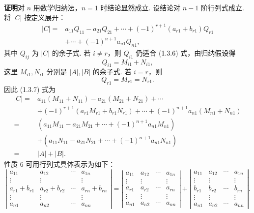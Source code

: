 \documentclass[UTF8, 12pt, fontset=fandol, oneside]{ctexart}
\begin{document}
\noindent\textbf{证明}\quad 对 $n$ 用数学归纳法，$n=1$ 时结论显然成立. 设结论对 $n-1$ 阶行列式成立. 将 $|C|$ 按定义展开：
\begin{equation}
\begin{aligned}
|C|={}&a_{11}Q_{11}-a_{21}Q_{21}+\cdots+(-1)^{r+1}(a_{r1}+b_{r1})Q_{r1}\\
&+\cdots+(-1)^{n+1}a_{n1}Q_{n1},
\end{aligned}
\tag{1.3.7}
\end{equation}
其中 $Q_{ij}$ 为 $|C|$ 的余子式. 若 $i\ne r$，则 $Q_{i1}$ 仍适合 (1.3.6) 式，由归纳假设得
\[
Q_{i1}=M_{i1}+N_{i1},
\]
这里 $M_{i1},N_{i1}$ 分别是 $|A|,|B|$ 的余子式. 若 $i=r$，则
\[
Q_{r1}=M_{r1}=N_{r1}.
\]
因此 (1.3.7) 式为
\[
\begin{aligned}
|C|={}&a_{11}(M_{11}+N_{11})-a_{21}(M_{21}+N_{21})+\cdots\\
&+(-1)^{r+1}(a_{r1}M_{r1}+b_{r1}N_{r1})+\cdots+(-1)^{n+1}a_{n1}(M_{n1}+N_{n1})\\
={}&(a_{11}M_{11}-a_{21}M_{21}+\cdots+(-1)^{n+1}a_{n1}M_{n1})\\
&+(a_{11}N_{11}-a_{21}N_{21}+\cdots+(-1)^{n+1}a_{n1}N_{n1})\\
={}&|A|+|B|.
\end{aligned}
\]
性质 6 可用行列式具体表示为如下：
\[
\left|\begin{array}{cccc}
a_{11} & a_{12} & \cdots & a_{1n}\\
\vdots & \vdots & & \vdots\\
a_{r1}+b_{r1} & a_{r2}+b_{r2} & \cdots & a_{rn}+b_{rn}\\
\vdots & \vdots & & \vdots\\
a_{n1} & a_{n2} & \cdots & a_{nn}
\end{array}\right|
=
\left|\begin{array}{cccc}
a_{11} & a_{12} & \cdots & a_{1n}\\
\vdots & \vdots & & \vdots\\
a_{r1} & a_{r2} & \cdots & a_{rn}\\
\vdots & \vdots & & \vdots\\
a_{n1} & a_{n2} & \cdots & a_{nn}
\end{array}\right|
+
\left|\begin{array}{cccc}
a_{11} & a_{12} & \cdots & a_{1n}\\
\vdots & \vdots & & \vdots\\
b_{r1} & b_{r2} & \cdots & b_{rn}\\
\vdots & \vdots & & \vdots\\
a_{n1} & a_{n2} & \cdots & a_{nn}
\end{array}\right|.
\]
\end{document}
